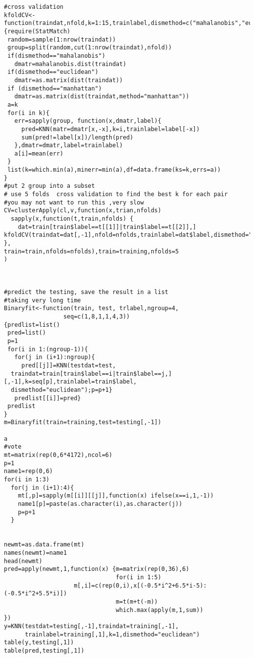 \documentclass[12pt,a4paper]{article}
\begin{document}
\begin{verbatim}
#cross validation
kfoldCV<-function(traindat,nfold,k=1:15,trainlabel,dismethod=c("mahalanobis","euclidean","manhattan"))
{require(StatMatch)
 random=sample(1:nrow(traindat))
 group=split(random,cut(1:nrow(traindat),nfold))
 if(dismethod=="mahalanobis")
   dmatr=mahalanobis.dist(traindat)
 if(dismethod=="euclidean")
   dmatr=as.matrix(dist(traindat))
 if (dismethod=="manhattan")
   dmatr=as.matrix(dist(traindat,method="manhattan"))
 a=k
 for(i in k){
   err=sapply(group, function(x,dmatr,label){
     pred=KNN(matr=dmatr[x,-x],k=i,trainlabel=label[-x])
     sum(pred!=label[x])/length(pred)
   },dmatr=dmatr,label=trainlabel)
   a[i]=mean(err)
 }
 list(k=which.min(a),minerr=min(a),df=data.frame(ks=k,errs=a))
}
#put 2 group into a subset
# use 5 folds  cross validation to find the best k for each pair
#you may not want to run this ,very slow
CV=clusterApply(cl,v,function(x,trian,nfolds)
  sapply(x,function(t,train,nfolds) {
    dat=train[train$label==t[[1]]|train$label==t[[2]],]
kfoldCV(traindat=dat[,-1],nfold=nfolds,trainlabel=dat$label,dismethod="euclidean")
},
train=train,nfolds=nfolds),train=training,nfolds=5
)



#predict the testing, save the result in a list
#taking very long time
Binaryfit<-function(train, test, trlabel,ngroup=4,
                 seq=c(1,8,1,1,4,3))
{predlist=list()
 pred=list()
 p=1
 for(i in 1:(ngroup-1)){
   for(j in (i+1):ngroup){
     pred[[j]]=KNN(testdat=test,
  traindat=train[train$label==i|train$label==j,][,-1],k=seq[p],trainlabel=train$label,
  dismethod="euclidean");p=p+1}
   predlist[[i]]=pred}
 predlist
}
m=Binaryfit(train=training,test=testing[,-1])

a
#vote
mt=matrix(rep(0,6*4172),ncol=6)
p=1
name1=rep(0,6)
for(i in 1:3)
  for(j in (i+1):4){
    mt[,p]=sapply(m[[i]][[j]],function(x) ifelse(x==i,1,-1))
    name1[p]=paste(as.character(i),as.character(j))
    p=p+1
  }


newmt=as.data.frame(mt)
names(newmt)=name1
head(newmt)
pred=apply(newmt,1,function(x) {m=matrix(rep(0,36),6)
                                for(i in 1:5)
                    m[,i]=c(rep(0,i),x[(-0.5*i^2+6.5*i-5):(-0.5*i^2+5.5*i)])
                                m=t(m+t(-m))
                                which.max(apply(m,1,sum))
})
y=KNN(testdat=testing[,-1],traindat=training[,-1],
      trainlabel=training[,1],k=1,dismethod="euclidean")
table(y,testing[,1])
table(pred,testing[,1])
\end{verbatim}
\end{document}
